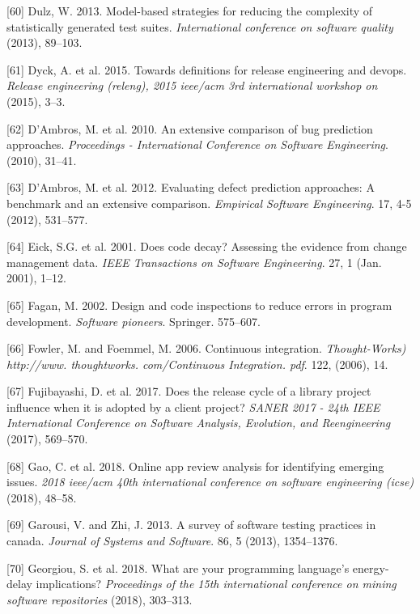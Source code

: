 \documentclass[]{book}
\begin{document}
\hypertarget{ref-dulz2013model}{}
{[}60{]} Dulz, W. 2013. Model-based strategies for reducing the
complexity of statistically generated test suites. \emph{International
conference on software quality} (2013), 89--103.

\hypertarget{ref-dyck2015a}{}
{[}61{]} Dyck, A. et al. 2015. Towards definitions for release
engineering and devops. \emph{Release engineering (releng), 2015
ieee/acm 3rd international workshop on} (2015), 3--3.

\hypertarget{ref-DAmbros2010}{}
{[}62{]} D'Ambros, M. et al. 2010. An extensive comparison of bug
prediction approaches. \emph{Proceedings - International Conference on
Software Engineering}. (2010), 31--41.

\hypertarget{ref-DAmbros2012}{}
{[}63{]} D'Ambros, M. et al. 2012. Evaluating defect prediction
approaches: A benchmark and an extensive comparison. \emph{Empirical
Software Engineering}. 17, 4-5 (2012), 531--577.

\hypertarget{ref-eick2001}{}
{[}64{]} Eick, S.G. et al. 2001. Does code decay? Assessing the evidence
from change management data. \emph{IEEE Transactions on Software
Engineering}. 27, 1 (Jan. 2001), 1--12.

\hypertarget{ref-fagan2002design}{}
{[}65{]} Fagan, M. 2002. Design and code inspections to reduce errors in
program development. \emph{Software pioneers}. Springer. 575--607.

\hypertarget{ref-fowler2006continuous}{}
{[}66{]} Fowler, M. and Foemmel, M. 2006. Continuous integration.
\emph{Thought-Works) http://www. thoughtworks. com/Continuous
Integration. pdf}. 122, (2006), 14.

\hypertarget{ref-fujibayashi2017a}{}
{[}67{]} Fujibayashi, D. et al. 2017. Does the release cycle of a
library project influence when it is adopted by a client project?
\emph{SANER 2017 - 24th IEEE International Conference on Software
Analysis, Evolution, and Reengineering} (2017), 569--570.

\hypertarget{ref-gao2018online}{}
{[}68{]} Gao, C. et al. 2018. Online app review analysis for identifying
emerging issues. \emph{2018 ieee/acm 40th international conference on
software engineering (icse)} (2018), 48--58.

\hypertarget{ref-GAROUSI20131354}{}
{[}69{]} Garousi, V. and Zhi, J. 2013. A survey of software testing
practices in canada. \emph{Journal of Systems and Software}. 86, 5
(2013), 1354--1376.

\hypertarget{ref-GKLS2018}{}
{[}70{]} Georgiou, S. et al. 2018. What are your programming language's
energy-delay implications? \emph{Proceedings of the 15th international
conference on mining software repositories} (2018), 303--313.
\end{document}
